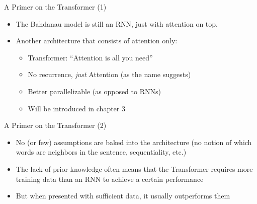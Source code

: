 \documentclass[11pt,compress,t,notes=noshow, xcolor=table]{beamer}
\begin{document}
\begin{vbframe}{A Primer on the Transformer (1)}

\vfill

\begin{itemize}
	\item The Bahdanau model is still an RNN, just with attention on top.
	\item Another architecture that consists of attention only: 
		\begin{itemize}
			\item Transformer: ``Attention is all you need'' 
			\item No recurrence, \textit{just} Attention (as the name suggests)
			\item Better parallelizable (as opposed to RNNs)
			\item Will be introduced in chapter 3
		\end{itemize}
\end{itemize}

\vfill

\end{vbframe}


\begin{vbframe}{A Primer on the Transformer (2)}

\vfill

\begin{itemize}
	\item No (or few) assumptions are baked into the architecture (no notion of which words are neighbors in the sentence, sequentiality, etc.)
	\item The lack of prior knowledge often means that the Transformer requires more training data than an RNN to achieve a certain performance
	\item But when presented with sufficient data, it usually outperforms them
\end{itemize}

\vfill

\end{vbframe}


\endlecture
\end{document}
